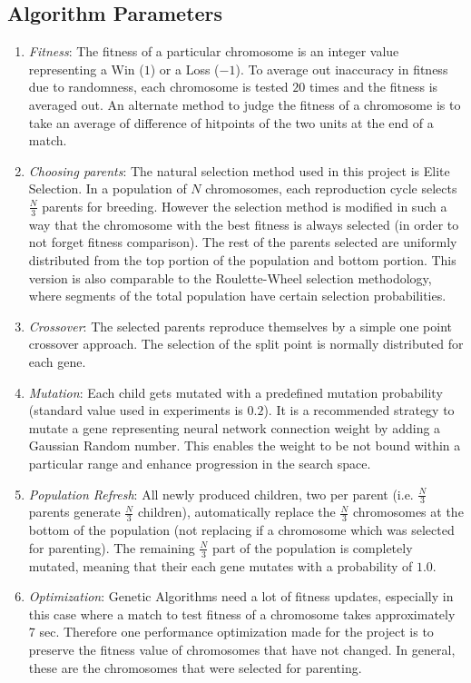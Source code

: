 \subsection{Algorithm Parameters}
\begin{enumerate}
\item \emph{Fitness}: The fitness of a particular chromosome is an integer value representing a Win ($1$) or a Loss ($-1$). To average out inaccuracy in fitness due to randomness, each chromosome is tested $20$ times and the fitness is averaged out. An alternate method to judge the fitness of a chromosome is to take an average of difference of hitpoints of the two units at the end of a match.
\item \emph{Choosing parents}: The natural selection method used in this project is Elite Selection. In a population of $N$ chromosomes, each reproduction cycle selects $\frac{N}{3}$ parents for breeding. However the selection method is modified in such a way that the chromosome with the best fitness is always selected (in order to not forget fitness comparison). The rest of the parents selected are uniformly distributed from the top portion of the population and bottom portion. This version is also comparable to the Roulette-Wheel selection methodology, where segments of the total population have certain selection probabilities.
\item \emph{Crossover}: The selected parents reproduce themselves by a simple one point crossover approach. The selection of the split point is normally distributed for each gene.
\item \emph{Mutation}: Each child gets mutated with a predefined mutation probability (standard value used in experiments is $0.2$). It is a recommended strategy to mutate a gene representing neural network connection weight by adding a Gaussian Random number. This enables the weight to be not bound within a particular range and enhance progression in the search space.
\item \emph{Population Refresh}: All newly produced children, two per parent (i.e. $\frac{N}{3}$ parents generate $\frac{N}{3}$ children), automatically replace the $\frac{N}{3}$ chromosomes at the bottom of the population (not replacing if a chromosome which was selected for parenting). The remaining $\frac{N}{3}$ part of the population is completely mutated, meaning that their each gene mutates with a probability of $1.0$.
\item \emph{Optimization}: Genetic Algorithms need a lot of fitness updates, especially in this case where a match to test fitness of a chromosome takes approximately 7 sec. Therefore one performance optimization made for the project is to preserve the fitness value of chromosomes that have not changed. In general, these are the chromosomes that were selected for parenting.
\end{enumerate}

